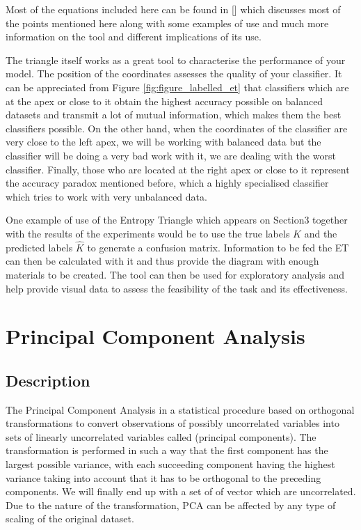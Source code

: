 \documentclass[12pt]{report}
\begin{document}
Most of the equations included here can be found in [] which discusses most of the points mentioned here along with some examples of use and much more information on the tool and different implications of its use. \par

The triangle itself works as a great tool to characterise the performance of your model. The position of the coordinates assesses the quality of your classifier. It can be appreciated from Figure \ref{fig:figure_labelled_et} that classifiers which are at the apex or close to it obtain the highest accuracy possible on balanced datasets and transmit a lot of mutual information, which makes them the best classifiers possible. On the other hand, when the coordinates of the classifier are very close to the left apex, we will be working with balanced data but the classifier will be doing a very bad work with it, we are dealing with the worst classifier. Finally, those who are located at the right apex or close to it represent the accuracy paradox mentioned before, which a highly specialised classifier which tries to work with very unbalanced data.\par

One example of use of the Entropy Triangle which appears on Section3 together with the results of the experiments would be to use the true labels $K$ and the predicted labels $\hat{K}$ to generate a confusion matrix. Information to be fed the ET can then be calculated with it and thus provide the diagram with enough materials to be created. The tool can then be used for exploratory analysis and help provide visual data to assess the feasibility of the task and its effectiveness.\par

\section{Principal Component Analysis}
\subsection{Description}
The Principal Component Analysis in a statistical procedure based on orthogonal transformations to convert observations of possibly uncorrelated variables into sets of linearly uncorrelated variables called (principal components). The transformation is performed in such a way that the first component has the largest possible variance, with each succeeding component having the highest variance taking into account that it has to be orthogonal to the preceding components. We will finally end up with a set of of vector which are uncorrelated. Due to the nature of the transformation, PCA can be affected by any type of scaling of the original dataset. \par
\end{document}
